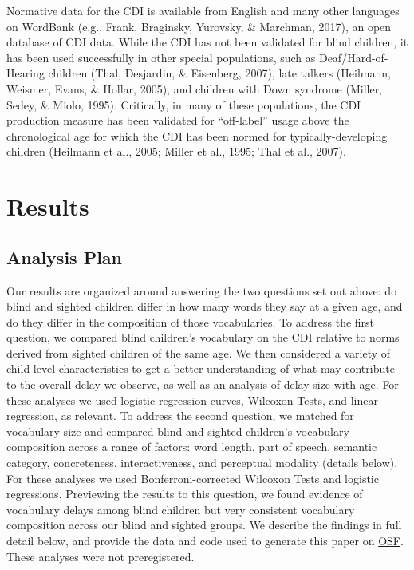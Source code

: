\documentclass[
  man,floatsintext]{apa6}
\begin{document}
Normative data for the CDI is available from English and many other languages on WordBank (e.g., Frank, Braginsky, Yurovsky, \& Marchman, 2017), an open database of CDI data. While the CDI has not been validated for blind children, it has been used successfully in other special populations, such as Deaf/Hard-of-Hearing children (Thal, Desjardin, \& Eisenberg, 2007), late talkers (Heilmann, Weismer, Evans, \& Hollar, 2005), and children with Down syndrome (Miller, Sedey, \& Miolo, 1995). Critically, in many of these populations, the CDI production measure has been validated for ``off-label'' usage above the chronological age for which the CDI has been normed for typically-developing children (Heilmann et al., 2005; Miller et al., 1995; Thal et al., 2007).

\hypertarget{results}{%
\section{Results}\label{results}}

\hypertarget{analysis-plan}{%
\subsection{Analysis Plan}\label{analysis-plan}}

Our results are organized around answering the two questions set out above: do blind and sighted children differ in how many words they say at a given age, and do they differ in the composition of those vocabularies. To address the first question, we compared blind children's vocabulary on the CDI relative to norms derived from sighted children of the same age. We then considered a variety of child-level characteristics to get a better understanding of what may contribute to the overall delay we observe, as well as an analysis of delay size with age. For these analyses we used logistic regression curves, Wilcoxon Tests, and linear regression, as relevant. To address the second question, we matched for vocabulary size and compared blind and sighted children's vocabulary composition across a range of factors: word length, part of speech, semantic category, concreteness, interactiveness, and perceptual modality (details below). For these analyses we used Bonferroni-corrected Wilcoxon Tests and logistic regressions. Previewing the results to this question, we found evidence of vocabulary delays among blind children but very consistent vocabulary composition across our blind and sighted groups. We describe the findings in full detail below, and provide the data and code used to generate this paper on \href{https://osf.io/uw6zm/?view_only=fdee466143f64d678d7f9d87b23ec566}{OSF}. These analyses were not preregistered.
\end{document}
